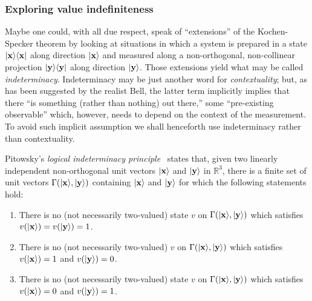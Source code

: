 \documentclass[%
  twocolumn,
 showpacs,
 showkeys,
 preprintnumbers,
 amsmath,amssymb,
 aps,
  pra,
  longbibliography,
 floatfix,
 ]{revtex4-1}
\begin{document}
\subsubsection{Exploring value indefiniteness}
\label{2017-b-c-eokst}

Maybe one could, with all due respect,
speak of ``extensions'' of the Kochen-Specker theorem by looking at situations
in which a system is prepared in a state
$\vert {\bf x} \rangle \langle {\bf x} \vert$  along direction
$\vert {\bf x} \rangle$
and measured along a non-orthogonal, non-collinear projection
$\vert {\bf y} \rangle \langle {\bf y} \vert$  along direction
$\vert {\bf y} \rangle$.
Those extensions yield what may be called~\cite{pitowsky:218,hru-pit-2003} {\em indeterminacy}.
Indeterminacy may be just another word for {\em contextuality};
but, as has been suggested by the realist Bell,
the latter term implicitly implies that
there ``is something (rather than nothing) out there,'' some ``pre-existing observable''
which, however, needs to depend on the context of the measurement.
To avoid such implicit assumption we shall henceforth use  indeterminacy rather than contextuality.

Pitowsky's  {\em logical indeterminacy principle}~\cite[Theorem~6, p.~226]{pitowsky:218}
states that, given two linearly independent
non-orthogonal unit vectors
$\vert {\bf x} \rangle$
and
$\vert {\bf y} \rangle$
in $\mathbb{R}^3$,
there is a finite set of unit vectors
$\Gamma ( \vert {\bf x} \rangle , \vert {\bf y} \rangle )$ containing
$\vert {\bf x} \rangle$
and
$\vert {\bf y} \rangle$
for which the following statements hold:
\begin{enumerate}
\item
There is no (not necessarily two-valued) state $v$ on $\Gamma ( \vert {\bf x} \rangle , \vert {\bf y} \rangle )$ which
satisfies
$v ( \vert {\bf x} \rangle ) = v ( \vert {\bf y} \rangle ) =1$.
\item
There is no (not necessarily two-valued)  $v$ on $\Gamma ( \vert {\bf x} \rangle , \vert {\bf y} \rangle )$
which satisfies $v ( \vert {\bf x} \rangle ) = 1$ and $ v ( \vert {\bf y} \rangle ) =0$.
\item
There is no (not necessarily two-valued)  state $v$ on $\Gamma ( \vert {\bf x} \rangle , \vert {\bf y} \rangle )$
which satisfies $v ( \vert {\bf x} \rangle ) = 0$ and $ v ( \vert {\bf y} \rangle ) =1$.
\end{enumerate}
\end{document}
